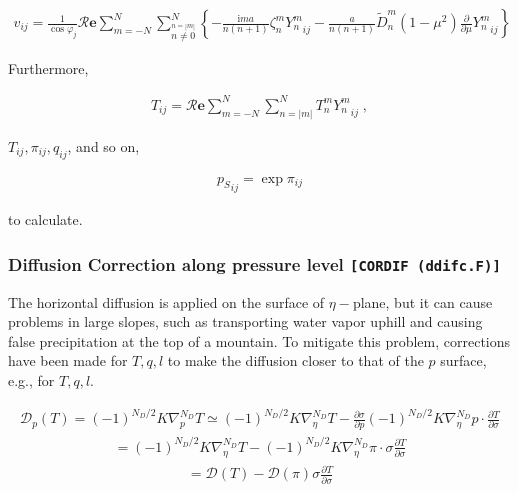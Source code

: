 \begin{eqnarray}
  v_{ij}
  =  \frac{1}{\cos \varphi_j}
     {\mathcal R}{\mathbf{e}} \sum_{m=-N}^{N}
                       \sum_{\stackrel{n=|m|}{n \neq 0}}^{N}
    \left\{
          -  \frac{\mathrm{i}m a}{n(n+1)} \zeta_n^m  {Y_n^m}_{ij}
          -  \frac{a}{n(n+1)} \tilde{D}_n^m
            (1-\mu^{2}) \frac{\partial{}}{\partial {\mu}} {Y_n^m}_{ij}
    \right\}
\end{eqnarray}

Furthermore,

\begin{eqnarray}
  T_{ij}
   =  {\mathcal R}{\mathbf{e}} \sum_{m=-N}^{N} \sum_{n=|m|}^{N}
      T_n^m  {Y_n^m}_{ij} \; ,
\end{eqnarray}

\(T_{ij}, \pi_{ij}, q_{ij}\), and so on,

\begin{eqnarray}
  {p_S}_{ij} = \exp \pi_{ij}
\end{eqnarray}

to calculate.

\hypertarget{diffusion-correction-along-pressure-level-cordif-ddifc.f}{%
\subsubsection{\texorpdfstring{Diffusion Correction along pressure level
\texttt{{[}CORDIF\ (ddifc.F){]}}}{Diffusion Correction along pressure level {[}CORDIF (ddifc.F){]}}}\label{diffusion-correction-along-pressure-level-cordif-ddifc.f}}

The horizontal diffusion is applied on the surface of \(\eta-\)plane,
but it can cause problems in large slopes, such as transporting water
vapor uphill and causing false precipitation at the top of a mountain.
To mitigate this problem, corrections have been made for \(T,q,l\) to
make the diffusion closer to that of the \(p\) surface, e.g., for
\(T,q,l\).

\begin{eqnarray}
  {\mathcal D}_p (T) = (-1)^{N_D/2} K \nabla^{N_D}_p T  
                \simeq  (-1)^{N_D/2} K \nabla^{N_D}_{\eta} T  
                      - \frac{\partial{\sigma}}{\partial {p}}
                      (-1)^{N_D/2} K \nabla^{N_D}_{\eta} p
                      \cdot \frac{\partial{T}}{\partial {\sigma}}
\end{eqnarray} \begin{eqnarray}
                =      (-1)^{N_D/2} K \nabla^{N_D}_{\eta} T  
                    -  (-1)^{N_D/2} K \nabla^{N_D}_{\eta} \pi
                          \cdot \sigma \frac{\partial{T}}{\partial {\sigma}}
\end{eqnarray} \begin{eqnarray}
                =    {\mathcal D} (T)
                    -  {\mathcal D} (\pi)
                       \sigma \frac{\partial{T}}{\partial {\sigma}}
\end{eqnarray}

